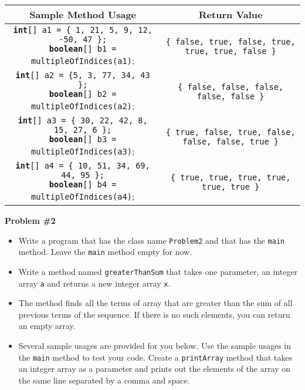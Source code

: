 \documentclass[12pt]{article}
\begin{document}
	\begin{center}
		\small
		\begin{tabular}{| c | c |}
			\hline\rule{0pt}{4ex}
			Sample Method Usage & Return Value \\
			\hline\rule{0pt}{5ex}
			\makecell[l]{\texttt{\textbf{int}[] a1 = \{ 1, 21, 5, 9, 12, -50, 47 \};} \\ \texttt{\textbf{boolean}[] b1 = multipleOfIndices(a1)};} & \texttt{\{ false, true, false, true, true, true, false \}}\\
			\hline\rule{0pt}{5ex}
			\makecell[l]{\texttt{\textbf{int}[] a2 = \{5, 3, 77, 34, 43 \};} \\ \texttt{\textbf{boolean}[] b2 = multipleOfIndices(a2)};} & \texttt{\{ false, false, false, false, false \}}\\
			\hline\rule{0pt}{5ex}
			\makecell[l]{\texttt{\textbf{int}[] a3 = \{ 30, 22, 42, 8, 15, 27, 6 \};} \\ \texttt{\textbf{boolean}[] b3 = multipleOfIndices(a3)};} & \texttt{\{ true, false, true, false, false, false, true \}}\\
			\hline\rule{0pt}{5ex}
			\makecell[l]{\texttt{\textbf{int}[] a4 = \{ 10, 51, 34, 69, 44, 95 \};} \\ \texttt{\textbf{boolean}[] b4 = multipleOfIndices(a4)};} & \texttt{\{ true, true, true, true, true, true \}}\\
			\hline
		\end{tabular}
	\end{center}
	\vspace*{0.5cm}
	\noindent\textbf{Problem \#2}
	\begin{itemize}
		\item Write a program that has the class name \texttt{Problem2} and that has the \texttt{main} method. Leave the \texttt{main} method empty for now.
		\item Write a method named \texttt{greaterThanSum} that takes one parameter, an integer array \texttt{a} and returns a new integer array \texttt{x}.
		\item  The method finds all the terms of array that are greater than the sum of all previous terms of the sequence. If there is no such elements, you can return an empty array.
		\item Several sample usages are provided for you below. Use the sample usages in the \texttt{main} method to test your code. Create a \texttt{printArray} method that takes an integer array as a parameter and prints out the elements of the array on the same line separated by a comma and space.
	\end{itemize}
\end{document}
